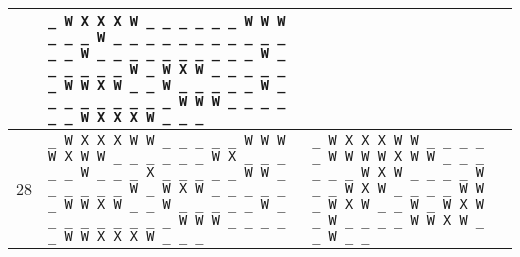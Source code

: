 \begin{longtable}{|m{}|p{}|p{}|m{}|}
{				}  										&	\texttt{\_  W  X  X  X  W  \_  \_  \_  \_\newline
															\_  \_  W  W  W  \_  \_  \_  W  \_\newline
															\_  \_  \_  \_  \_  \_  \_  \_  \_  \_\newline
															\_  \_  W  \_  \_  \_  \_  \_  \_  \_\newline
															\_  \_  \_  W  \_  \_  \_  \_  \_  \_\newline
															W  \_  W  X  W  \_  \_  \_  \_  \_\newline
															\_  W  W  X  W  \_  \_  W  \_  \_\newline
															\_  \_  \_  W  \_  \_  \_  \_  \_  \_\newline
															\_  \_  \_  W  W  W  \_  \_  \_  \_\newline
															\_  \_  W  X  X  X  W  \_  \_  \_\newline
															}										& \checkmark \\ \hline
		28	&	\texttt{\_  W  X  X  X  W  W  \_  \_  \_\newline
				\_  \_  W  W  W  W  X  W  W  \_\newline
				\_  \_  \_  \_  \_  W  X  \_  \_  \_\newline
				\_  \_  W  \_  \_  \_  X  \_  \_  \_\newline
				\_  \_  W  W  \_  \_  \_  \_  \_  \_\newline
				W  \_  W  X  W  \_  \_  \_  \_  \_\newline
				\_  W  W  X  W  \_  \_  W  \_  \_\newline
				\_  \_  \_  W  \_  \_  \_  \_  \_  \_\newline
				\_  \_  \_  W  W  W  \_  \_  \_  \_\newline
				\_  W  W  X  X  X  W  \_  \_  \_\newline
				}  										&	\texttt{\_  W  X  X  X  W  W  \_  \_  \_\newline
															\_  \_  W  W  W  W  X  W  W  \_\newline
															\_  \_  \_  \_  \_  W  X  W  \_  \_\newline
															\_  \_  W  \_  \_  W  X  W  \_  \_\newline
															\_  \_  W  W  \_  W  X  W  \_  \_\newline
															W  \_  W  X  W  \_  W  \_  \_  \_\newline
															\_  W  W  X  W  \_  \_  W  \_  \_\newline
}
\end{longtable}

